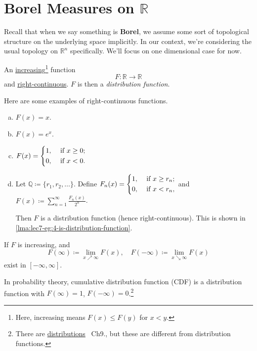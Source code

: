 \section{Borel Measures on \(\mathbb{R}\)}
\begin{prev}
	Recall that when we say something is \textbf{Borel}, we assume some sort of topological structure on the underlying space implicitly.
	In our context, we're considering the usual topology on \(\mathbb{R}^n \) specifically. We'll focus on one dimensional case
	for now.
\end{prev}

\begin{definition}\label{def:distribution-function}
	An \underline{increasing}\footnote{Here, increasing means \(F(x)\leq F(y)\) for \(x<y\).} function
	\[
		F\colon \mathbb{R} \to \mathbb{R}
	\]
	and \underline{right-continuous}. \(F\) is then a \emph{distribution function}.
\end{definition}

\begin{eg}
	Here are some examples of right-continuous functions.
	\begin{enumerate}[(a)]
		\item \(F(x) = x\).
		\item \(F(x) = e^x\).
		\item \(F(x) = \begin{dcases}
			      1, & \text{ if } x\geq 0; \\
			      0, & \text{ if } x < 0.
		      \end{dcases}\)
		\item \label{eg:lec7-4} Let \(\mathbb{Q} \coloneqq \{r_1, r_2, \dots  \}\). Define
		      \(
		      F_n(x) = \begin{dcases}
			      1, & \text{ if } x\geq r_n; \\
			      0, & \text{ if } x < r_n,
		      \end{dcases}
		      \) and \( F(x) \coloneqq \sum_{n=1}^{\infty} \frac{F_n(x)}{2^n}\).

		      Then \(F\) is a distribution function (hence right-continuous). This is shown in \autoref{lma:lec7-eg:4-is-distribution-function}.
	\end{enumerate}
\end{eg}
\begin{note}
	If \(F\) is increasing, and
	\[
		F(\infty )\coloneqq \lim_{x \nearrow \infty} F(x),\quad F(-\infty ) \coloneqq \lim_{x \searrow \infty} F(x)
	\]
	exist in \([-\infty , \infty ]\).

	In probability theory, cumulative distribution function (CDF) is a distribution function with \(F(\infty ) = 1\), \(F(-\infty ) = 0\).\footnote{There are \underline{distributions}~\cite{folland1999real} Ch9., but these are different from distribution functions.}
\end{note}

